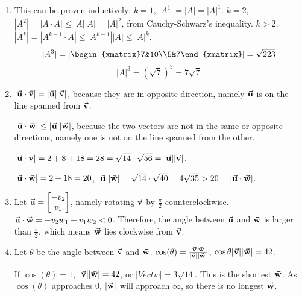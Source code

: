 \begin{exercise}{10}
  \begin{enumerate}
    \item This can be proven inductively: $k = 1$, $|A^1| = |A| = |A|^1$. $k = 2$, $|A^2| = |A \cdot A| \leq |A||A| = |A|^2$, from Cauchy-Schwarz's inequality. $k > 2$, $|A^k| = |A^{k-1} \cdot A| \leq |A^{k-1}||A| \leq |A|^k$. \rQED
          $$|A^3| = |\begin{xmatrix}7&10\\5&7\end{xmatrix}| = \sqrt{223}$$
          $$|A|^3 = (\sqrt{7})^3 = 7\sqrt{7}$$
          
    \item $|\vec{\mathbf{u}} \cdot \vec{\mathbf{v}}| = |\vec{\mathbf{u}}||\vec{\mathbf{v}}|$, because they are in opposite direction, namely $\vec{\mathbf{u}}$ is on the line spanned from $\vec{\mathbf{v}}$.
          
          $|\vec{\mathbf{u}} \cdot \vec{\mathbf{w}}| \leq |\vec{\mathbf{u}}||\vec{\mathbf{w}}|$, because the two vectors are not in the same or opposite directions, namely one is not on the line spanned from the other.
          
          $|\vec{\mathbf{u}} \cdot \vec{\mathbf{v}}| = 2 + 8 + 18 = 28 = \sqrt{14} \cdot \sqrt{56} = |\vec{\mathbf{u}}||\vec{\mathbf{v}}|$.
          
          $|\vec{\mathbf{u}} \cdot \vec{\mathbf{w}}| = 2 + 18 = 20$, $|\vec{\mathbf{u}}||\vec{\mathbf{w}}| = \sqrt{14} \cdot \sqrt{40} = 4\sqrt{35} > 20 = |\vec{\mathbf{u}} \cdot \vec{\mathbf{w}}|$.
    
    \item Let $\vec{\mathbf{u}} = \begin{bmatrix}-v_2\\v_1\end{bmatrix}$, namely rotating $\vec{\mathbf{v}}$ by $\frac{\pi}{2}$ counterclockwise. $\vec{\mathbf{u}} \cdot \vec{\mathbf{w}} = -v_2w_1 + v_1w_2 < 0$. Therefore, the angle between $\vec{\mathbf{u}}$ and $\vec{\mathbf{w}}$ is larger than $\frac{\pi}{2}$, which means $\vec{\mathbf{w}}$ lies clockwise from $\vec{\mathbf{v}}$.
    
    \item Let $\theta$ be the angle between $\vec{\mathbf{v}}$ and $\vec{\mathbf{w}}$. $\cos(\theta) = \frac{\vec{\mathbf{v}} \cdot \vec{\mathbf{w}}}{|\vec{\mathbf{v}}||\vec{\mathbf{w}}|}$, $\cos{\theta}|\vec{\mathbf{v}}||\vec{\mathbf{w}}| = 42$.
    
          If $\cos(\theta) = 1$, $|\vec{\mathbf{v}}||\vec{\mathbf{w}}| = 42$, or $|Vect{w}| = 3\sqrt{14}$. This is the shortest $\vec{\mathbf{w}}$. As $\cos(\theta)$ approaches $0$, $|\vec{\mathbf{w}}|$ will approach $\infty$, so there is no longest $\vec{\mathbf{w}}$.
  \end{enumerate}
\end{exercise}

